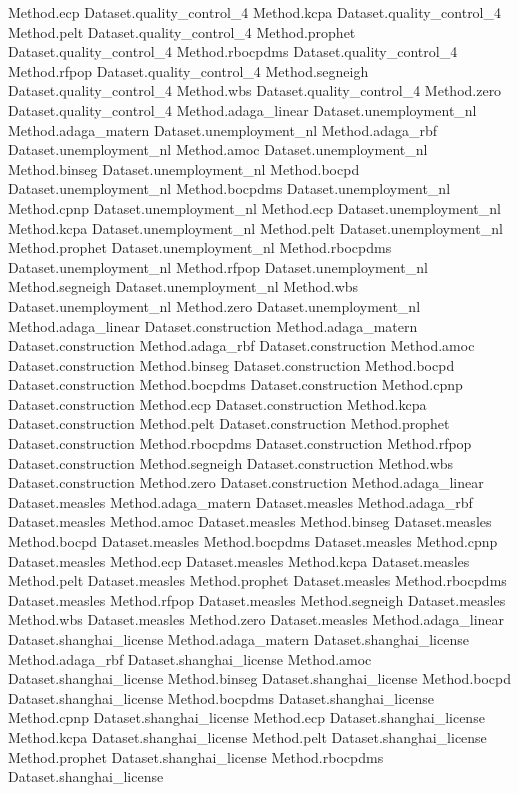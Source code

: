 Method.ecp Dataset.quality_control_4
Method.kcpa Dataset.quality_control_4
Method.pelt Dataset.quality_control_4
Method.prophet Dataset.quality_control_4
Method.rbocpdms Dataset.quality_control_4
Method.rfpop Dataset.quality_control_4
Method.segneigh Dataset.quality_control_4
Method.wbs Dataset.quality_control_4
Method.zero Dataset.quality_control_4
Method.adaga_linear Dataset.unemployment_nl
Method.adaga_matern Dataset.unemployment_nl
Method.adaga_rbf Dataset.unemployment_nl
Method.amoc Dataset.unemployment_nl
Method.binseg Dataset.unemployment_nl
Method.bocpd Dataset.unemployment_nl
Method.bocpdms Dataset.unemployment_nl
Method.cpnp Dataset.unemployment_nl
Method.ecp Dataset.unemployment_nl
Method.kcpa Dataset.unemployment_nl
Method.pelt Dataset.unemployment_nl
Method.prophet Dataset.unemployment_nl
Method.rbocpdms Dataset.unemployment_nl
Method.rfpop Dataset.unemployment_nl
Method.segneigh Dataset.unemployment_nl
Method.wbs Dataset.unemployment_nl
Method.zero Dataset.unemployment_nl
Method.adaga_linear Dataset.construction
Method.adaga_matern Dataset.construction
Method.adaga_rbf Dataset.construction
Method.amoc Dataset.construction
Method.binseg Dataset.construction
Method.bocpd Dataset.construction
Method.bocpdms Dataset.construction
Method.cpnp Dataset.construction
Method.ecp Dataset.construction
Method.kcpa Dataset.construction
Method.pelt Dataset.construction
Method.prophet Dataset.construction
Method.rbocpdms Dataset.construction
Method.rfpop Dataset.construction
Method.segneigh Dataset.construction
Method.wbs Dataset.construction
Method.zero Dataset.construction
Method.adaga_linear Dataset.measles
Method.adaga_matern Dataset.measles
Method.adaga_rbf Dataset.measles
Method.amoc Dataset.measles
Method.binseg Dataset.measles
Method.bocpd Dataset.measles
Method.bocpdms Dataset.measles
Method.cpnp Dataset.measles
Method.ecp Dataset.measles
Method.kcpa Dataset.measles
Method.pelt Dataset.measles
Method.prophet Dataset.measles
Method.rbocpdms Dataset.measles
Method.rfpop Dataset.measles
Method.segneigh Dataset.measles
Method.wbs Dataset.measles
Method.zero Dataset.measles
Method.adaga_linear Dataset.shanghai_license
Method.adaga_matern Dataset.shanghai_license
Method.adaga_rbf Dataset.shanghai_license
Method.amoc Dataset.shanghai_license
Method.binseg Dataset.shanghai_license
Method.bocpd Dataset.shanghai_license
Method.bocpdms Dataset.shanghai_license
Method.cpnp Dataset.shanghai_license
Method.ecp Dataset.shanghai_license
Method.kcpa Dataset.shanghai_license
Method.pelt Dataset.shanghai_license
Method.prophet Dataset.shanghai_license
Method.rbocpdms Dataset.shanghai_license
